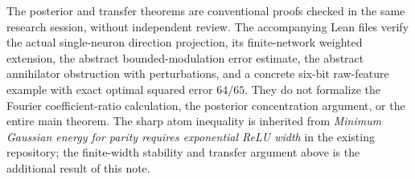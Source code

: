 \documentclass[11pt]{article}
\begin{document}
The posterior and transfer theorems are conventional proofs checked in
the same research session, without independent review. The accompanying
Lean files verify the actual single-neuron direction projection, its
finite-network weighted extension, the abstract bounded-modulation
error estimate, the abstract annihilator obstruction with perturbations,
and a concrete six-bit raw-feature example with exact optimal squared
error $64/65$. They do not formalize the Fourier coefficient-ratio
calculation, the posterior concentration argument, or the entire main theorem.
The sharp atom inequality is inherited from
\emph{Minimum Gaussian energy for parity requires exponential ReLU width}
in the existing repository; the finite-width stability and transfer
argument above is the additional result of this note.
\end{document}
